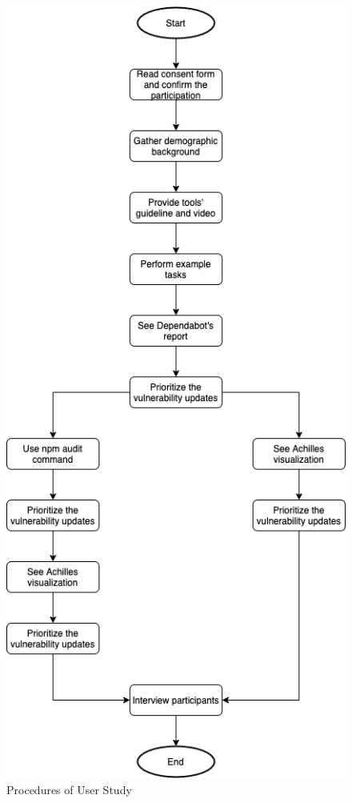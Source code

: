 \documentclass[conference]{IEEEtran}
\begin{document}
	\begin{figure}[tb]
		\centering
		\includegraphics[scale=0.5]{Figures/fig1.png}
		\caption{Procedures of User Study}
		\label{fig:proceduresofuserstudy}
	\end{figure}
	
\end{document}
